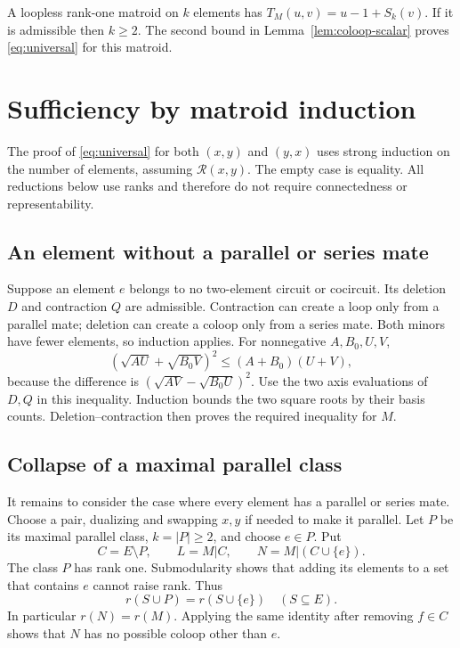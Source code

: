 \documentclass[11pt,a4paper]{article}
\newcommand{\Reg}{\mathcal R}
\begin{document}
A loopless rank-one matroid on $k$ elements has
$T_M(u,v)=u-1+S_k(v)$. If it is admissible then $k\geq2$.
The second bound in Lemma~\ref{lem:coloop-scalar} proves
\eqref{eq:universal} for this matroid.

\section{Sufficiency by matroid induction}

The proof of \eqref{eq:universal} for both $(x,y)$ and $(y,x)$ uses strong
induction on the number of elements, assuming $\Reg(x,y)$.
The empty case is equality. All reductions below use ranks and therefore
do not require connectedness or representability.

\subsection{An element without a parallel or series mate}
Suppose an element $e$ belongs to no two-element circuit or cocircuit.
Its deletion $D$ and contraction $Q$ are admissible. Contraction can create
a loop only from a parallel mate; deletion can create a coloop only from
a series mate. Both minors have fewer elements, so induction applies.
For nonnegative $A,B_0,U,V$,
\[
(\sqrt{AU}+\sqrt{B_0V})^2\leq(A+B_0)(U+V),
\]
because the difference is $(\sqrt{AV}-\sqrt{B_0U})^2$.
Use the two axis evaluations of $D,Q$ in this inequality.
Induction bounds the two square roots by their basis counts.
Deletion--contraction then proves the required inequality for $M$.

\subsection{Collapse of a maximal parallel class}
It remains to consider the case where every element has a parallel or series mate.
Choose a pair, dualizing and swapping $x,y$ if needed to make it parallel.
Let $P$ be its maximal parallel class, $k=|P|\geq2$, and choose $e\in P$.
Put
\[
C=E\setminus P,\qquad L=M|C,\qquad N=M|(C\cup\{e\}).
\]
The class $P$ has rank one. Submodularity shows that adding its elements
to a set that contains $e$ cannot raise rank. Thus
\begin{equation}\label{eq:parallel-rank}
r(S\cup P)=r(S\cup\{e\})\quad(S\subseteq E).
\end{equation}
In particular $r(N)=r(M)$. Applying the same identity after removing
$f\in C$ shows that $N$ has no possible coloop other than $e$.
\end{document}
